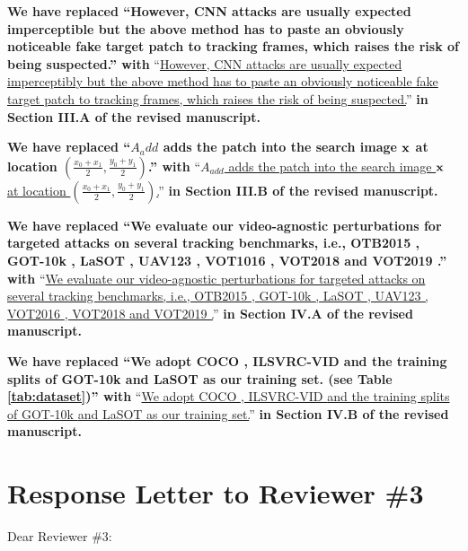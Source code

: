 \documentclass[12pt]{article}
\begin{document}
\textbf{We have replaced ``However, CNN attacks are usually expected imperceptible but the above method has to paste an obviously noticeable fake target patch to tracking frames, which raises the risk of being suspected.'' with}
``\uline{However, CNN attacks are usually expected imperceptibly but the above method has to paste an obviously noticeable fake target patch to tracking frames, which raises the risk of being suspected.}''
\textbf{in Section III.A of the revised manuscript.}

\textbf{We have  replaced ``$A_add$ adds the patch into the search image $\textbf x$ at location $(\frac{x_0+x_1}{2},\frac{y_0+y_1}{2})$.'' with}
``\uline{$A_{add}$ adds the patch into the search image $\textbf x$ at location $(\frac{x_0+x_1}{2},\frac{y_0+y_1}{2})$.}''
\textbf{in Section III.B of the revised manuscript.}

\textbf{We have replaced ``We evaluate our video-agnostic perturbations for targeted attacks on several tracking benchmarks, i.e., OTB2015 \cite{OTB}, GOT-10k \cite{GOT-10k}, LaSOT \cite{LaSOT}, UAV123 \cite{UAV123}, VOT1016 \cite{VOT2016}, VOT2018 \cite{VOT2018} and VOT2019 \cite{VOT2019}.'' with}
``\uline{We evaluate our video-agnostic perturbations for targeted attacks on several tracking benchmarks, i.e., OTB2015 \cite{OTB}, GOT-10k \cite{GOT-10k}, LaSOT \cite{LaSOT}, UAV123 \cite{UAV123}, VOT2016 \cite{VOT2016}, VOT2018 \cite{VOT2018} and VOT2019 \cite{VOT2019}.}''
\textbf{in Section IV.A of the revised manuscript.}

\textbf{We have replaced ``We adopt COCO \cite{COCO}, ILSVRC-VID \cite{VID} and the training splits of GOT-10k \cite{GOT-10k} and LaSOT \cite{LaSOT} as our training set. (see Table \ref{tab:dataset})'' with}
``\uline{We adopt COCO \cite{COCO}, ILSVRC-VID \cite{VID} and the training splits of GOT-10k \cite{GOT-10k} and LaSOT \cite{LaSOT} as our training set.}''
\textbf{in Section IV.B of the revised manuscript.}

\clearpage
\newpage
{\centering\section*{Response Letter to Reviewer \#3}}
\noindent Dear Reviewer \#3:
\end{document}
